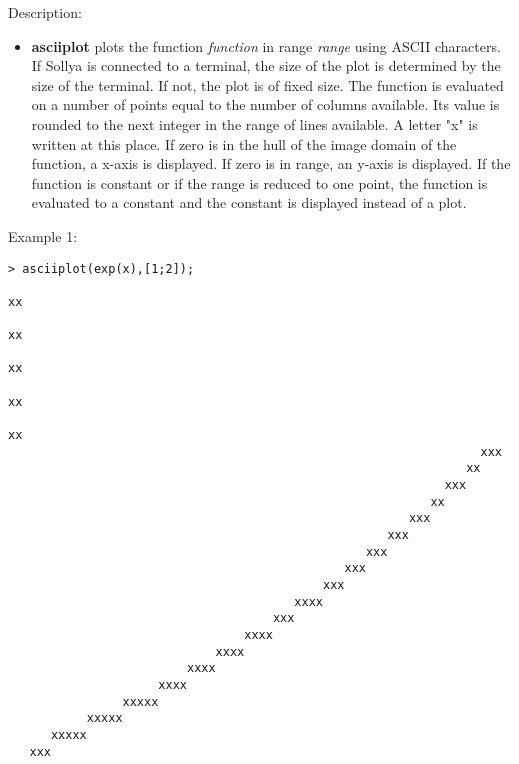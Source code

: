 \noindent Description: \begin{itemize}

\item \textbf{asciiplot} plots the function \emph{function} in range \emph{range}
   using ASCII characters.  If Sollya is connected to a terminal, the
   size of the plot is determined by the size of the terminal. If not,
   the plot is of fixed size.  The function is evaluated on a number of
   points equal to the number of columns available. Its value is rounded
   to the next integer in the range of lines available. A letter "x" is
   written at this place. If zero is in the hull of the image domain of
   the function, a x-axis is displayed. If zero is in range, an y-axis is
   displayed.  If the function is constant or if the range is reduced to
   one point, the function is evaluated to a constant and the constant is
   displayed instead of a plot.
\end{itemize}
\noindent Example 1: 
\begin{center}\begin{minipage}{14.8cm}\begin{Verbatim}[frame=single]
   > asciiplot(exp(x),[1;2]);
                                                                             xx
                                                                           xx  
                                                                         xx    
                                                                       xx      
                                                                     xx        
                                                                  xxx          
                                                                xx             
                                                             xxx               
                                                           xx                  
                                                        xxx                    
                                                     xxx                       
                                                  xxx                          
                                               xxx                             
                                            xxx                                
                                        xxxx                                   
                                     xxx                                       
                                 xxxx                                          
                             xxxx                                              
                         xxxx                                                  
                     xxxx                                                      
                xxxxx                                                          
           xxxxx                                                               
      xxxxx                                                                    
   xxx                                                                         
\end{Verbatim}
\end{minipage}\end{center}
